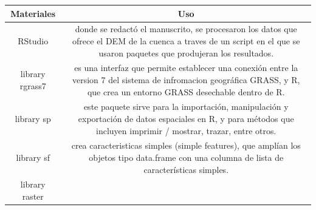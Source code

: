 \documentclass[11pt,]{article}
\begin{document}
\begin{longtable}[]{@{}cc@{}}
\toprule
\begin{minipage}[b]{0.11\columnwidth}\centering\strut
Materiales\strut
\end{minipage} & \begin{minipage}[b]{0.83\columnwidth}\centering\strut
Uso\strut
\end{minipage}\tabularnewline
\midrule
\endhead
\begin{minipage}[t]{0.11\columnwidth}\centering\strut
RStudio\strut
\end{minipage} & \begin{minipage}[t]{0.83\columnwidth}\centering\strut
donde se redactó el manuscrito, se procesaron los datos que ofrece el
DEM de la cuenca a traves de un script en el que se usaron paquetes que
produjeran los resultados.\strut
\end{minipage}\tabularnewline
\begin{minipage}[t]{0.11\columnwidth}\centering\strut
library rgrass7\strut
\end{minipage} & \begin{minipage}[t]{0.83\columnwidth}\centering\strut
es una interfaz que permite establecer una conexión entre la version 7
del sistema de infromacion geográfica GRASS, y R, que crea un entorno
GRASS desechable dentro de R.\strut
\end{minipage}\tabularnewline
\begin{minipage}[t]{0.11\columnwidth}\centering\strut
library sp\strut
\end{minipage} & \begin{minipage}[t]{0.83\columnwidth}\centering\strut
este paquete sirve para la importación, manipulación y exportación de
datos espaciales en R, y para métodos que incluyen imprimir / mostrar,
trazar, entre otros.\strut
\end{minipage}\tabularnewline
\begin{minipage}[t]{0.11\columnwidth}\centering\strut
library sf\strut
\end{minipage} & \begin{minipage}[t]{0.83\columnwidth}\centering\strut
crea caracteristicas simples (simple features), que amplían los objetos
tipo data.frame con una columna de lista de características
simples.\strut
\end{minipage}\tabularnewline
\begin{minipage}[t]{0.11\columnwidth}\centering\strut
library raster\strut
\end{minipage} & \begin{minipage}[t]{0.83\columnwidth}\centering\strut

\end{minipage}
\end{longtable}
\end{document}
